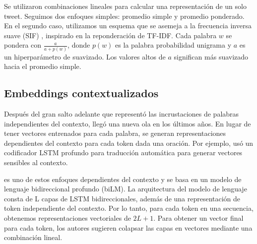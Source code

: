 Se utilizaron combinaciones lineales para calcular una representación de un solo tweet.
Seguimos dos enfoques simples: promedio simple y promedio ponderado. En el segundo caso, utilizamos un esquema que se asemeja a la frecuencia inversa suave (SIF) \cite {arora17}, inspirado en la reponderación de TF-IDF.
Cada palabra $ w $ se pondera con $ \frac {a} {a + p (w)} $, donde $ p (w) $ es la palabra probabilidad unigrama y $ a $ es un hiperparámetro de suavizado.
Los valores altos de $ a $ significan más suavizado hacia el promedio simple.



\subsection{Embeddings contextualizados}
\label{subsec:elmo}

Después del gran salto adelante que representó las incrustaciones de palabras independientes del contexto, llegó una nueva ola en los últimos años. En lugar de tener vectores entrenados para cada palabra, se generan representaciones dependientes del contexto para cada token dada una oración. Por ejemplo, \citet{mccann2017learned} usó un codificador LSTM profundo para traducción automática para generar vectores sensibles al contexto.

\elmo{} \cite{peters2018} es uno de estos enfoques dependientes del contexto y se basa en un modelo de lenguaje bidireccional profundo (biLM). La arquitectura del modelo de lenguaje consta de L capas de LSTM bidireccionales, además de una representación de token independiente del contexto. Por lo tanto, para cada token en una secuencia, obtenemos representaciones vectoriales de $ 2L + 1 $.
Para obtener un vector final para cada token, los autores sugieren colapsar las capas en vectores mediante una combinación lineal.

%

